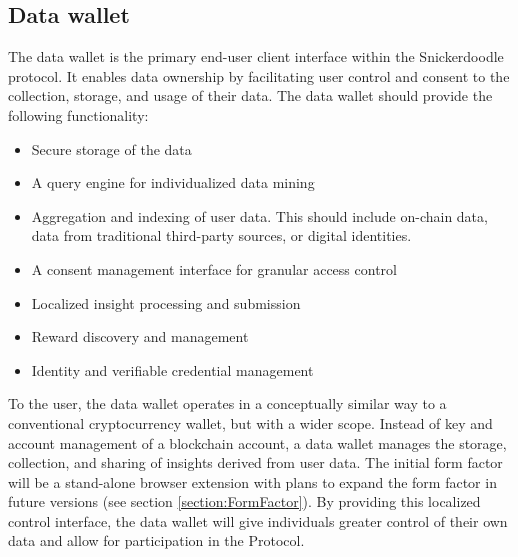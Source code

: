 \subsection{Data wallet}
\label{section:DataWallet}
%





The data wallet is the primary end-user client interface within the Snickerdoodle protocol. It enables data ownership by facilitating user control 
and consent to the collection, storage, and usage of their data. The data wallet should provide the following functionality:
\begin{itemize}
  \item Secure storage of the data
  \item A query engine for individualized data mining
  \item Aggregation and indexing of user data. This should include on-chain data, data from traditional third-party sources, or digital identities.
  \item A consent management interface for granular access control
  \item Localized insight processing and submission
  \item Reward discovery and management
  \item Identity and verifiable credential management
\end{itemize}


To the user, the data wallet operates in a conceptually similar way to a conventional cryptocurrency wallet, but with a wider scope. 
Instead of key and account management of a blockchain account, a data wallet manages the storage, collection, and sharing of insights derived 
from user data. The initial form factor will be a stand-alone browser extension with plans to expand the form factor in future versions (see 
section \ref{section:FormFactor}). By providing this localized control interface, the data wallet will give individuals greater control 
of their own data and allow for participation in the Protocol.

